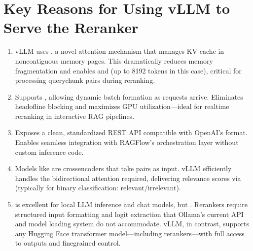 \documentclass[letterpaper,10pt,english]{sphinxmanual}
\begin{document}
\section{Key Reasons for Using vLLM to Serve the Reranker}
\label{\detokenize{vllm:key-reasons-for-using-vllm-to-serve-the-reranker}}\begin{enumerate}
%
\item {} 
\sphinxAtStartPar
{}
\sphinxhyphen{} vLLM uses , a novel attention mechanism that manages KV cache in non\sphinxhyphen{}contiguous memory pages.
\sphinxhyphen{} This dramatically reduces memory fragmentation and enables  and  (up to 8192 tokens in this case), critical for processing query\sphinxhyphen{}chunk pairs during reranking.

\item {} 
\sphinxAtStartPar
{}
\sphinxhyphen{} Supports , allowing dynamic batch formation as requests arrive.
\sphinxhyphen{} Eliminates head\sphinxhyphen{}of\sphinxhyphen{}line blocking and maximizes GPU utilization—ideal for real\sphinxhyphen{}time reranking in interactive RAG pipelines.

\item {} 
\sphinxAtStartPar
{}
\sphinxhyphen{} Exposes a clean, standardized REST API compatible with OpenAI’s format.
\sphinxhyphen{} Enables seamless integration with RAGFlow’s orchestration layer without custom inference code.

\item {} 
\sphinxAtStartPar
{}
\sphinxhyphen{} Models like  are cross\sphinxhyphen{}encoders that take  pairs as input.
\sphinxhyphen{} vLLM efficiently handles the bidirectional attention required, delivering relevance scores via  (typically for binary classification: relevant/irrelevant).

\item {} 
\sphinxAtStartPar
{}
\sphinxhyphen{}  is excellent for local LLM inference and chat models, but .
\sphinxhyphen{} Rerankers require structured input formatting and logit extraction that Ollama’s current API and model loading system do not accommodate.
\sphinxhyphen{} vLLM, in contrast, supports any Hugging Face transformer model—including rerankers—with full access to outputs and fine\sphinxhyphen{}grained control.


\end{enumerate}
\end{document}
